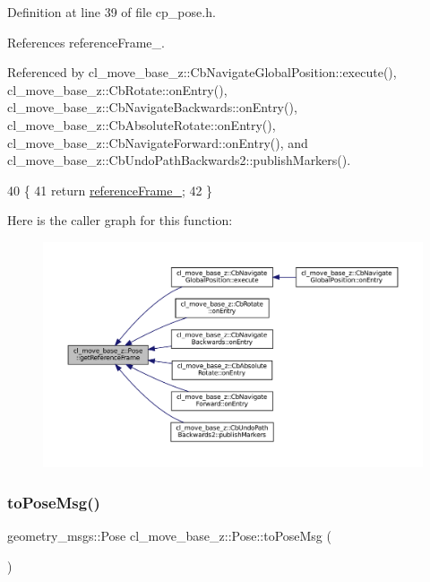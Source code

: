 Definition at line 39 of file cp\+\_\+pose.\+h.



References reference\+Frame\+\_\+.



Referenced by cl\+\_\+move\+\_\+base\+\_\+z\+::\+Cb\+Navigate\+Global\+Position\+::execute(), cl\+\_\+move\+\_\+base\+\_\+z\+::\+Cb\+Rotate\+::on\+Entry(), cl\+\_\+move\+\_\+base\+\_\+z\+::\+Cb\+Navigate\+Backwards\+::on\+Entry(), cl\+\_\+move\+\_\+base\+\_\+z\+::\+Cb\+Absolute\+Rotate\+::on\+Entry(), cl\+\_\+move\+\_\+base\+\_\+z\+::\+Cb\+Navigate\+Forward\+::on\+Entry(), and cl\+\_\+move\+\_\+base\+\_\+z\+::\+Cb\+Undo\+Path\+Backwards2\+::publish\+Markers().


\begin{DoxyCode}
40     \{
41         \textcolor{keywordflow}{return} \hyperlink{classcl__move__base__z_1_1Pose_a6a7a593232b6edaf99103d48ad8da9d3}{referenceFrame\_};
42     \}
\end{DoxyCode}
Here is the caller graph for this function\+:
\nopagebreak
\begin{figure}[H]
\begin{center}
\leavevmode
\includegraphics[width=350pt]{classcl__move__base__z_1_1Pose_af8c2dc151e74aa8da6b283d1c8563051_icgraph}
\end{center}
\end{figure}
\mbox{\label{classcl__move__base__z_1_1Pose_a9faf8c6b437ff6b19c8bddd692908dca}} 
\subsubsection{\texorpdfstring{to\+Pose\+Msg()}{toPoseMsg()}}
{\footnotesize\ttfamily geometry\+\_\+msgs\+::\+Pose cl\+\_\+move\+\_\+base\+\_\+z\+::\+Pose\+::to\+Pose\+Msg (\begin{DoxyParamCaption}{ }\end{DoxyParamCaption})\hspace{0.3cm}{\ttfamily [inline]}}



